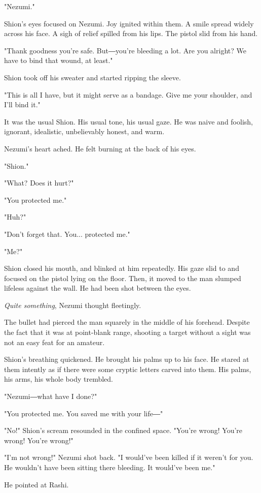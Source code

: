 "Nezumi."

Shion's eyes focused on Nezumi. Joy ignited within them. A smile spread
widely across his face. A sigh of relief spilled from his lips. The
pistol slid from his hand.

"Thank goodness you're safe. But―you're bleeding a lot. Are you alright?
We have to bind that wound, at least."

Shion took off his sweater and started ripping the sleeve.

"This is all I have, but it might serve as a bandage. Give me your
shoulder, and I'll bind it."

It was the usual Shion. His usual tone, his usual gaze. He was naive and
foolish, ignorant, idealistic, unbelievably honest, and warm.

Nezumi's heart ached. He felt burning at the back of his eyes.

"Shion."

"What? Does it hurt?"

"You protected me."

"Huh?"

"Don't forget that. You... protected me."

"Me?"

Shion closed his mouth, and blinked at him repeatedly. His gaze slid to
and focused on the pistol lying on the floor. Then, it moved to the man
slumped lifeless against the wall. He had been shot between the eyes.

\emph{Quite something}, Nezumi thought fleetingly.

The bullet had pierced the man squarely in the middle of his forehead.
Despite the fact that it was at point-blank range, shooting a target
without a sight was not an easy feat for an amateur.

Shion's breathing quickened. He brought his palms up to his face. He
stared at them intently as if there were some cryptic letters carved
into them. His palms, his arms, his whole body trembled.

"Nezumi―what have I done?"

"You protected me. You saved me with your life―"

"No!" Shion's scream resounded in the confined space. "You're wrong!
You're wrong! You're wrong!"

"I'm not wrong!" Nezumi shot back. "I would've been killed if it weren't
for you. He wouldn't have been sitting there bleeding. It would've been
me."

He pointed at Rashi.


